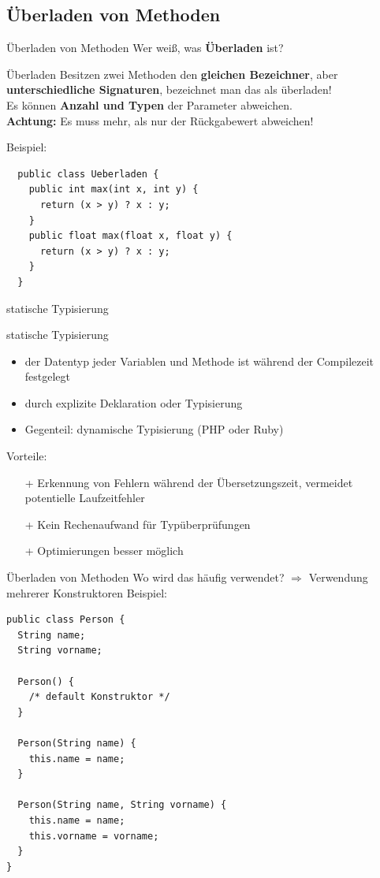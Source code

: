 \documentclass[18pt]{beamer}
\begin{document}
\subsection{Überladen von Methoden}
\begin{frame}[fragile]{Überladen von Methoden}
  Wer weiß, was \textbf{Überladen} ist?
  \pause
  \begin{block}{Überladen}
    Besitzen zwei Methoden den \textbf{gleichen Bezeichner}, aber \textbf{unterschiedliche Signaturen}, bezeichnet man das als überladen!\\
    Es können \textbf{Anzahl und Typen} der Parameter abweichen.\\
    \textbf{Achtung:} Es muss mehr, als nur der Rückgabewert abweichen!
  \end{block}
  \pause
  Beispiel:
  \begin{lstlisting}
  public class Ueberladen {
    public int max(int x, int y) {
      return (x > y) ? x : y;
    }
    public float max(float x, float y) {
      return (x > y) ? x : y;
    }
  }\end{lstlisting}
  \pause
	\begin{flushleft}
	
	\end{flushleft}
\end{frame}

\begin{frame}{statische Typisierung}
  \begin{block}{statische Typisierung}
    \begin{itemize}
      \item der Datentyp jeder Variablen und Methode ist während der Compilezeit festgelegt
      \item durch explizite Deklaration oder Typisierung
      \item Gegenteil: dynamische Typisierung (PHP oder Ruby)
    \end{itemize}
  \end{block}
  \pause
  Vorteile:
  \begin{itemize}
    \item[+] Erkennung von Fehlern während der Übersetzungszeit, vermeidet potentielle Laufzeitfehler
    \item[+] Kein Rechenaufwand für Typüberprüfungen
    \item[+] Optimierungen besser möglich
  \end{itemize}
\end{frame}

\begin{frame}[fragile]{Überladen von Methoden}
  Wo wird das häufig verwendet?\pause
  $\Rightarrow$ Verwendung mehrerer Konstruktoren
  Beispiel:
  \begin{lstlisting}
public class Person {   
  String name;
  String vorname;

  Person() {    
    /* default Konstruktor */
  }

  Person(String name) {
    this.name = name;
  }

  Person(String name, String vorname) {
    this.name = name;
    this.vorname = vorname;
  }
}\end{lstlisting}
\end{frame}
\end{document}
